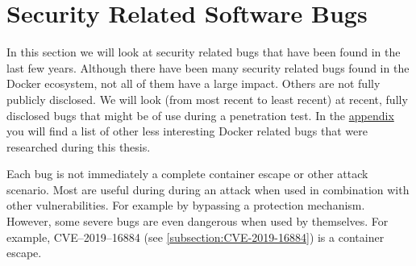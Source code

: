 \section{Security Related Software Bugs}\label{section:bugs}
In this section we will look at security related bugs that have been found in the last few years. Although there have been many security related bugs found in the Docker ecosystem, not all of them have a large impact. Others are not fully publicly disclosed. We will look (from most recent to least recent) at recent, fully disclosed bugs that might be of use during a penetration test. In the \hyperref[appendix:CVE-List]{appendix} you will find a list of other less interesting Docker related bugs that were researched during this thesis.

Each bug is not immediately a complete container escape or other attack scenario. Most are useful during during an attack when used in combination with other vulnerabilities. For example by bypassing a protection mechanism.
However, some severe bugs are even dangerous when used by themselves. For example, CVE--2019--16884 (see \autoref{subsection:CVE-2019-16884}) is a container escape.








